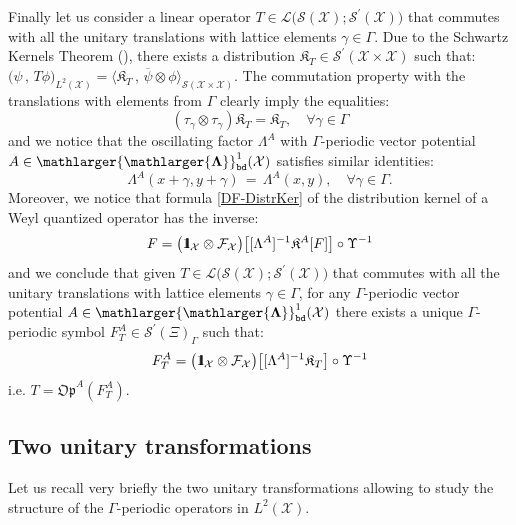 \documentclass[12pt]{article}
\theoremstyle{definition}
\def\Op{\mathfrak{Op}}
\def\X{\mathcal X}
\def\bb1{{\rm{1}\hspace{-3pt}\mathbf{l}}}
\def\beq{\begin{equation}}
\def\eeq{\end{equation}}
\def\Fb{\mathlarger{\mathlarger{\mathbf{\Lambda}}}_{\text{\tt bd}}}
\numberwithin{equation}{section}
\begin{document}
Finally let us consider a linear operator $T\in\mathcal{L}\big(\mathscr{S}(\X);\mathscr{S}^\prime(\X)\big)$ that commutes with all the unitary translations with lattice elements $\gamma\in\Gamma$. Due to the Schwartz Kernels Theorem (\cite{Schw}), there exists a distribution $\mathfrak{K}_T\in\mathscr{S}^\prime(\X\times\X)$ such that: $\big(\psi\,,\,T\phi\big)_{L^2(\X)}=\big\langle\mathfrak{K}_T\,,\,\overline{\psi}\otimes\phi\big\rangle_{\mathscr{S}(\X\times\X)}$. The commutation property with the translations with elements from $\Gamma$ clearly imply the equalities:
\beq\label{F-com-KAF-gamma}
(\tau_{\gamma}\otimes\tau_{\gamma})\mathfrak{K}_T=\mathfrak{K}_T,\quad\forall\gamma\in\Gamma
\eeq
and we notice that the oscillating factor $\Lambda^A$ with $\Gamma$-periodic vector potential $A\in\Fb^1(\X)$ satisfies similar identities: 
\beq
\Lambda^A(x+\gamma,y+\gamma)\,=\,\Lambda^A(x,y),\quad\forall\gamma\in\Gamma.
\eeq
Moreover, we notice that formula \eqref{DF-DistrKer} of the distribution kernel of a Weyl quantized operator has the inverse:
\beq
F=\big(\bb1_{\X}\otimes\mathcal{F}_{\X}\big)\big[[\Lambda^A]^{-1}\mathfrak{K}^A[F]\big]\circ\Upsilon^{-1}
\eeq
and we conclude that given $T\in\mathcal{L}\big(\mathscr{S}(\X);\mathscr{S}^\prime(\X)\big)$ that commutes with all the unitary translations with lattice elements $\gamma\in\Gamma$, for any $\Gamma$-periodic vector potential $A\in\Fb^1(\X)$ there exists a unique $\Gamma$-periodic symbol $F^A_T\in\mathscr{S}^\prime(\Xi)_{\Gamma}$ such that:
\beq
F^A_T=\big(\bb1_{\X}\otimes\mathcal{F}_{\X}\big)\big[[\Lambda^A]^{-1}\mathfrak{K}_T\big]\circ\Upsilon^{-1}
\eeq 
i.e. $T=\Op^A(F^A_T)$.

\subsection{Two unitary transformations}

Let us recall very briefly the two unitary transformations allowing to study the structure of the $\Gamma$-periodic operators in $L^2(\X)$.
\end{document}
